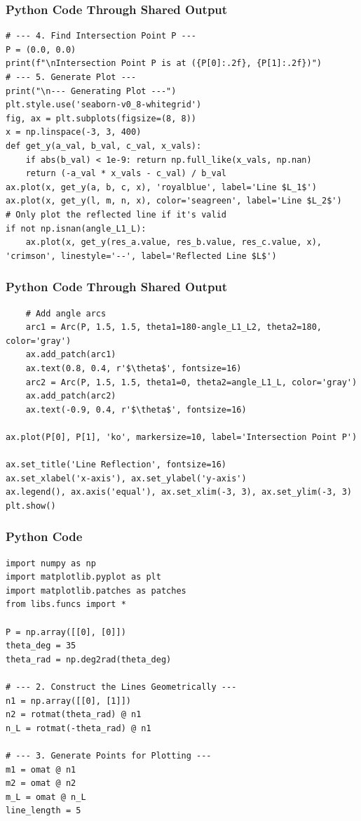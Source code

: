 \documentclass{beamer}
\begin{document}
\begin{frame}[fragile]
\frametitle{Python Code Through Shared Output}
\begin{lstlisting}
# --- 4. Find Intersection Point P ---
P = (0.0, 0.0)
print(f"\nIntersection Point P is at ({P[0]:.2f}, {P[1]:.2f})")
# --- 5. Generate Plot ---
print("\n--- Generating Plot ---")
plt.style.use('seaborn-v0_8-whitegrid')
fig, ax = plt.subplots(figsize=(8, 8))
x = np.linspace(-3, 3, 400)
def get_y(a_val, b_val, c_val, x_vals):
    if abs(b_val) < 1e-9: return np.full_like(x_vals, np.nan)
    return (-a_val * x_vals - c_val) / b_val
ax.plot(x, get_y(a, b, c, x), 'royalblue', label='Line $L_1$')
ax.plot(x, get_y(l, m, n, x), color='seagreen', label='Line $L_2$')
# Only plot the reflected line if it's valid
if not np.isnan(angle_L1_L):
    ax.plot(x, get_y(res_a.value, res_b.value, res_c.value, x), 'crimson', linestyle='--', label='Reflected Line $L$')
    \end{lstlisting}
\end{frame}
\begin{frame}[fragile]
\frametitle{Python Code Through Shared Output}
\begin{lstlisting}
    # Add angle arcs
    arc1 = Arc(P, 1.5, 1.5, theta1=180-angle_L1_L2, theta2=180, color='gray')
    ax.add_patch(arc1)
    ax.text(0.8, 0.4, r'$\theta$', fontsize=16)
    arc2 = Arc(P, 1.5, 1.5, theta1=0, theta2=angle_L1_L, color='gray')
    ax.add_patch(arc2)
    ax.text(-0.9, 0.4, r'$\theta$', fontsize=16)

ax.plot(P[0], P[1], 'ko', markersize=10, label='Intersection Point P')

ax.set_title('Line Reflection', fontsize=16)
ax.set_xlabel('x-axis'), ax.set_ylabel('y-axis')
ax.legend(), ax.axis('equal'), ax.set_xlim(-3, 3), ax.set_ylim(-3, 3)
plt.show()
\end{lstlisting}
\end{frame}
\begin{frame}[fragile]
\frametitle{Python Code}
\begin{lstlisting}
import numpy as np
import matplotlib.pyplot as plt
import matplotlib.patches as patches
from libs.funcs import * 

P = np.array([[0], [0]])
theta_deg = 35
theta_rad = np.deg2rad(theta_deg)

# --- 2. Construct the Lines Geometrically ---
n1 = np.array([[0], [1]])
n2 = rotmat(theta_rad) @ n1
n_L = rotmat(-theta_rad) @ n1

# --- 3. Generate Points for Plotting ---
m1 = omat @ n1
m2 = omat @ n2
m_L = omat @ n_L
line_length = 5
\end{lstlisting}
\end{frame}
\end{document}
